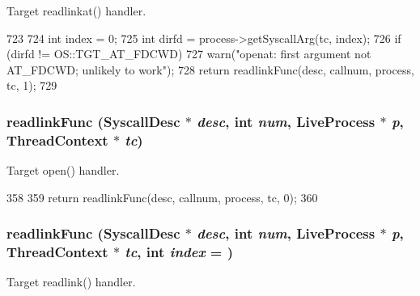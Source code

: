 Target readlinkat() handler. 


\begin{DoxyCode}
723 {
724     int index = 0;
725     int dirfd = process->getSyscallArg(tc, index);
726     if (dirfd != OS::TGT_AT_FDCWD)
727         warn("openat: first argument not AT_FDCWD; unlikely to work");
728     return readlinkFunc(desc, callnum, process, tc, 1);
729 }
\end{DoxyCode}
\hypertarget{syscall__emul_8hh_ad3f837adc09d39f3de515a223236040e}{
\subsubsection[{readlinkFunc}]{ readlinkFunc ({\bf SyscallDesc} $\ast$ {\em desc}, \/  int {\em num}, \/  {\bf LiveProcess} $\ast$ {\em p}, \/  {\bf ThreadContext} $\ast$ {\em tc})}}
\label{syscall__emul_8hh_ad3f837adc09d39f3de515a223236040e}


Target open() handler. 


\begin{DoxyCode}
358 {
359     return readlinkFunc(desc, callnum, process, tc, 0);
360 }
\end{DoxyCode}
\hypertarget{syscall__emul_8hh_a713e8bc427660dda08453f913ee48c21}{
\subsubsection[{readlinkFunc}]{ readlinkFunc ({\bf SyscallDesc} $\ast$ {\em desc}, \/  int {\em num}, \/  {\bf LiveProcess} $\ast$ {\em p}, \/  {\bf ThreadContext} $\ast$ {\em tc}, \/  int {\em index} = {})}}
\label{syscall__emul_8hh_a713e8bc427660dda08453f913ee48c21}


Target readlink() handler. 



